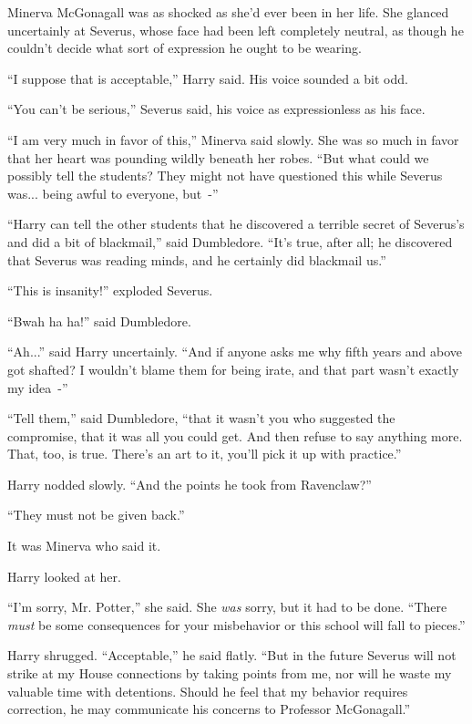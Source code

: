 Minerva McGonagall was as shocked as she'd ever been in her life. She glanced uncertainly at Severus, whose face had been left completely neutral, as though he couldn't decide what sort of expression he ought to be wearing.

``I suppose that is acceptable,'' Harry said. His voice sounded a bit odd.

``You can't be serious,'' Severus said, his voice as expressionless as his face.

``I am very much in favor of this,'' Minerva said slowly. She was so much in favor that her heart was pounding wildly beneath her robes. ``But what could we possibly tell the students? They might not have questioned this while Severus was... being awful to everyone, but~-''

``Harry can tell the other students that he discovered a terrible secret of Severus's and did a bit of blackmail,'' said Dumbledore. ``It's true, after all; he discovered that Severus was reading minds, and he certainly did blackmail us.''

``This is insanity!'' exploded Severus.

``Bwah ha ha!'' said Dumbledore.

``Ah...'' said Harry uncertainly. ``And if anyone asks me why fifth years and above got shafted? I wouldn't blame them for being irate, and that part wasn't exactly my idea~-''

``Tell them,'' said Dumbledore, ``that it wasn't you who suggested the compromise, that it was all you could get. And then refuse to say anything more. That, too, is true. There's an art to it, you'll pick it up with practice.''

Harry nodded slowly. ``And the points he took from Ravenclaw?''

``They must not be given back.''

It was Minerva who said it.

Harry looked at her.

``I'm sorry, Mr. Potter,'' she said. She \emph{was} sorry, but it had to be done. ``There \emph{must} be some consequences for your misbehavior or this school will fall to pieces.''

Harry shrugged. ``Acceptable,'' he said flatly. ``But in the future Severus will not strike at my House connections by taking points from me, nor will he waste my valuable time with detentions. Should he feel that my behavior requires correction, he may communicate his concerns to Professor McGonagall.''

